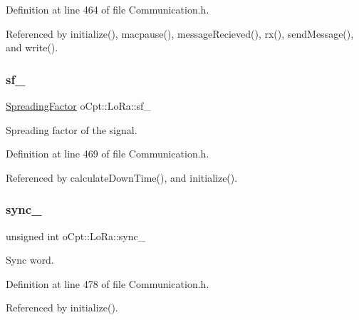 Definition at line 464 of file Communication.\+h.



Referenced by initialize(), macpause(), message\+Recieved(), rx(), send\+Message(), and write().

\hypertarget{classo_cpt_1_1_lo_ra_acebd51c3b66932357035150f21e88d38}{}\label{classo_cpt_1_1_lo_ra_acebd51c3b66932357035150f21e88d38} 
\subsubsection{\texorpdfstring{sf\+\_\+}{sf\_}}
{\footnotesize\ttfamily \hyperlink{classo_cpt_1_1_lo_ra_a8a682cc4db78b2afb14ad5cdb713b1e1}{Spreading\+Factor} o\+Cpt\+::\+Lo\+Ra\+::sf\+\_\+\hspace{0.3cm}{\ttfamily [protected]}}



Spreading factor of the signal. 



Definition at line 469 of file Communication.\+h.



Referenced by calculate\+Down\+Time(), and initialize().

\hypertarget{classo_cpt_1_1_lo_ra_a42f093f868ce1b8d4525031569b77c19}{}\label{classo_cpt_1_1_lo_ra_a42f093f868ce1b8d4525031569b77c19} 
\subsubsection{\texorpdfstring{sync\+\_\+}{sync\_}}
{\footnotesize\ttfamily unsigned int o\+Cpt\+::\+Lo\+Ra\+::sync\+\_\+\hspace{0.3cm}{\ttfamily [protected]}}



Sync word. 



Definition at line 478 of file Communication.\+h.



Referenced by initialize().

\hypertarget{classo_cpt_1_1_lo_ra_aef791d801da3a184f574bb5dcf465bd3}{}\label{classo_cpt_1_1_lo_ra_aef791d801da3a184f574bb5dcf465bd3} 
